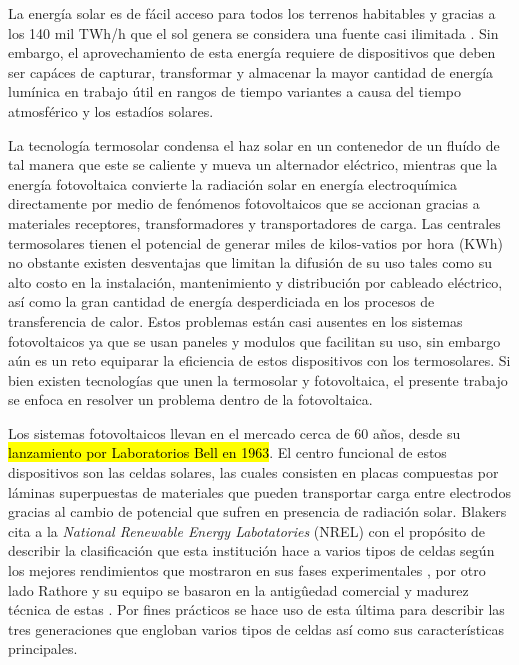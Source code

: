 La energía solar es de fácil acceso para todos los terrenos habitables y gracias a los 140 mil TWh/h que el sol genera se considera una fuente casi ilimitada \cite{hammarstrom2012}.
Sin embargo, el aprovechamiento de esta energía requiere de dispositivos que deben ser capáces de capturar, transformar 
y almacenar la mayor cantidad de energía lumínica en trabajo útil en rangos de tiempo variantes a causa del tiempo atmosférico y
los estadíos solares.

La tecnología termosolar condensa el haz solar en un contenedor de un fluído de tal manera que este se caliente
y mueva un alternador eléctrico, mientras que la energía fotovoltaica convierte la radiación solar en energía electroquímica directamente 
por medio de fenómenos fotovoltaicos que se accionan gracias a materiales receptores, transformadores y transportadores de carga.
Las centrales termosolares tienen el potencial de generar miles de kilos-vatios por hora (KWh) no obstante 
existen desventajas que limitan la difusión de su uso tales como su alto costo en la instalación, mantenimiento y distribución por cableado 
eléctrico, así como la gran cantidad de energía desperdiciada en los procesos de transferencia de calor. Estos problemas están casi ausentes
en los sistemas fotovoltaicos ya que se usan paneles y modulos que facilitan su uso, sin embargo aún es un reto equiparar la eficiencia de estos 
dispositivos con los termosolares. Si bien existen tecnologías que unen la termosolar y fotovoltaica, el presente trabajo se enfoca en resolver
un problema dentro de la fotovoltaica.

Los sistemas fotovoltaicos llevan en el mercado cerca de 60 años, desde su \hl{lanzamiento por Laboratorios Bell en 1963}. El centro funcional de estos 
dispositivos son las celdas solares, las cuales consisten en placas compuestas por láminas superpuestas de materiales que pueden transportar carga 
entre electrodos gracias al cambio de potencial que sufren en presencia de radiación solar. Blakers cita a la 
\textit{National Renewable Energy Labotatories} (NREL) con el propósito de describir la clasificación que esta institución hace a varios tipos de celdas 
según los mejores rendimientos que mostraron en sus fases experimentales \cite{blakers2013}, por otro lado Rathore y su equipo se basaron en la antigûedad 
comercial y madurez técnica de estas \cite{rathore2021}. Por fines prácticos se hace uso de esta última para describir las tres generaciones que engloban
varios tipos de celdas así como sus características principales. 

